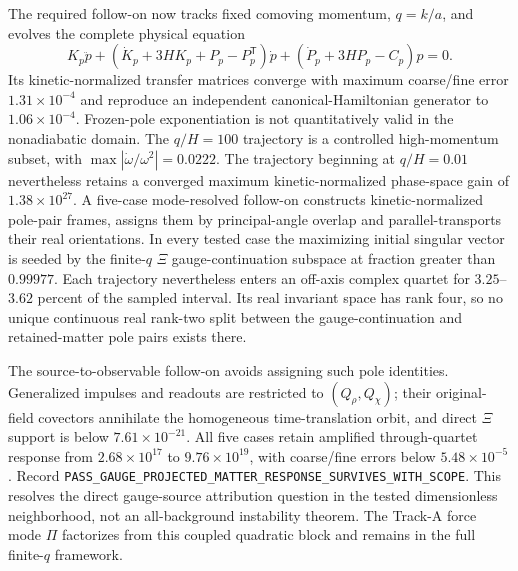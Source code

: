 The required follow-on now tracks fixed comoving momentum, $q=k/a$, and
evolves the complete physical equation
\begin{equation}
 K_p\ddot p+
 \left(\dot K_p+3HK_p+P_p-P_p^{\mathsf T}\right)\dot p+
 \left(\dot P_p+3HP_p-C_p\right)p=0.
 \label{eq:fixed-comoving-transfer}
\end{equation}
Its kinetic-normalized transfer matrices converge with maximum coarse/fine
error $1.31\times10^{-4}$ and reproduce an independent canonical-Hamiltonian
generator to $1.06\times10^{-4}$.  Frozen-pole exponentiation is not
quantitatively valid in the nonadiabatic domain.  The $q/H=100$ trajectory is
a controlled high-momentum subset, with
$\max|\dot\omega/\omega^2|=0.0222$.  The trajectory beginning at $q/H=0.01$
nevertheless retains a converged maximum kinetic-normalized phase-space gain
of $1.38\times10^{27}$.  A five-case mode-resolved follow-on constructs
kinetic-normalized pole-pair frames, assigns them by principal-angle overlap
and parallel-transports their real orientations.  In every tested case the
maximizing initial singular vector is seeded by the finite-$q$ $\Xi$
gauge-continuation subspace at fraction greater than $0.99977$.  Each
trajectory nevertheless enters an off-axis complex quartet for
$3.25$--$3.62$ percent of the sampled interval.  Its real invariant space has
rank four, so no unique continuous real rank-two split between the
gauge-continuation and retained-matter pole pairs exists there.

The source-to-observable follow-on avoids assigning such pole identities.
Generalized impulses and readouts are restricted to $(Q_\rho,Q_\chi)$; their
original-field covectors annihilate the homogeneous time-translation orbit,
and direct $\Xi$ support is below $7.61\times10^{-21}$.  All five cases retain
amplified through-quartet response from $2.68\times10^{17}$ to
$9.76\times10^{19}$, with coarse/fine errors below $5.48\times10^{-5}$.
Record
\texttt{PASS\_GAUGE\_PROJECTED\_MATTER\_RESPONSE\_SURVIVES\_WITH\_SCOPE}.
This resolves the direct gauge-source attribution question in the tested
dimensionless neighborhood, not an all-background instability theorem.  The
Track-A force mode $\Pi$ factorizes from this coupled quadratic block and
remains in the full finite-$q$ framework.

